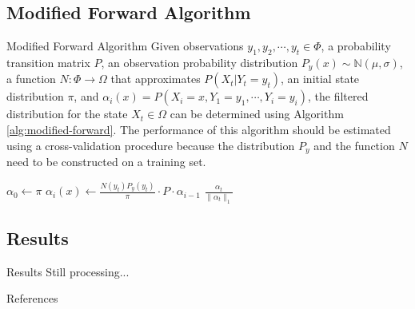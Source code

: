 \documentclass{beamer}
\begin{document}
\subsection{Modified Forward Algorithm}
\begin{frame}{Modified Forward Algorithm}
Given observations $y_1, y_2, \cdots, y_t \in \Phi$, a probability transition matrix $P$, an observation probability distribution $P_y(x) \sim \mathbb{N}(\mu,\sigma)$, a function $N: \Phi \to \Omega$ that approximates $P(X_t | Y_t = y_t)$, an initial state distribution $\pi$, and $\alpha_i(x) = P(X_i = x, Y_1 = y_1, \cdots, Y_i = y_i)$, the filtered distribution for the state $X_t \in \Omega$ can be determined using Algorithm \ref{alg:modified-forward}.
The performance of this algorithm should be estimated using a cross-validation procedure because the distribution $P_y$ and the function $N$ need to be constructed on a training set.
\begin{algorithm}[H]
\caption{Modified Forward Algorithm}
\label{alg:modified-forward}
\begin{algorithmic}
\STATE $\alpha_0 \leftarrow \pi$
\STATE $\alpha_i(x) \leftarrow \frac{N(y_t) P_y(y_t)}{\pi} \cdot P \cdot \alpha_{i-1}$
\ENDFOR
\RETURN $\frac{\alpha_t}{\|\alpha_t\|_1}$
\end{algorithmic}
\end{algorithm}
\end{frame}

\subsection{Results}
\begin{frame}{Results}
Still processing...
\end{frame}


\nocite{Russell:2009:AIM:1671238}
\nocite{viterbi1967error}
\nocite{Richard1991}
\begin{frame}{References}

\end{frame}
\end{document}
